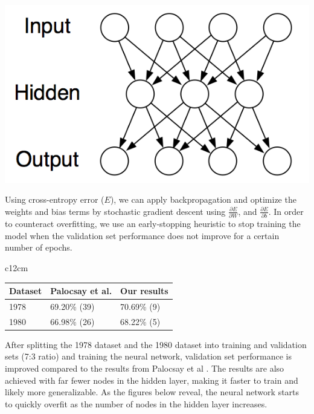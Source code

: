 \documentclass[a0,landscape]{a0poster}
\begin{document}
\begin{multicols}{4}
\begin{center}\vspace{1cm}
\includegraphics[width=0.8\linewidth]{neural_network}
\end{center}\vspace{1cm}

Using cross-entropy error ($E$), we can apply backpropagation and optimize the weights and bias terms by stochastic gradient descent using $\frac{\partial E}{\partial W}$, and $\frac{\partial E}{\partial b}$. In order to counteract overfitting, we use an early-stopping heuristic to stop training the model when the validation set performance does not improve for a certain number of epochs.

\begin{table}{c}{12cm} %
\begin{tabular}{l l l}
\toprule
\textbf{Dataset} & \textbf{Palocsay et al.} & \textbf{Our results}\\
\midrule
1978 & 69.20\% (39) & 70.69\% (9) \\
1980 & 66.98\% (26) & 68.22\% (5) \\
\bottomrule
\end{tabular}
\end{table}

After splitting the 1978 dataset and the 1980 dataset into training and validation sets (7:3 ratio) and training the neural network, validation set performance is improved compared to the results from Palocsay et al \cite{bib1}. The results are also achieved with far fewer nodes in the hidden layer, making it faster to train and likely more generalizable. As the figures below reveal, the neural network starts to quickly overfit as the number of nodes in the hidden layer increases.


\end{multicols}
\end{document}
